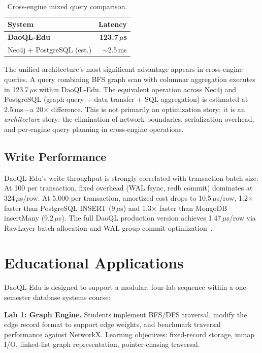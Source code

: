 \documentclass[11pt,a4paper]{article}
\begin{document}
\begin{table}[ht]
\centering
\caption{Cross-engine mixed query comparison.}
\begin{tabular}{lr}
\toprule
\textbf{System} & \textbf{Latency} \\
\midrule
\textbf{DaoQL-Edu}          & \textbf{123.7\,$\mu$s} \\
Neo4j + PostgreSQL (est.)   & $\sim$2.5\,ms \\
\bottomrule
\end{tabular}
\label{tab:mixed}
\end{table}

The unified architecture's most significant advantage appears in
cross-engine queries. A query combining BFS graph scan with columnar
aggregation executes in 123.7\,$\mu$s within DaoQL-Edu. The equivalent
operation across Neo4j and PostgreSQL (graph query + data transfer + SQL
aggregation) is estimated at 2.5\,ms---a 20$\times$ difference. This is
not primarily an optimization story; it is an \emph{architecture} story: the
elimination of network boundaries, serialization overhead, and per-engine
query planning in cross-engine operations.

\subsection{Write Performance}

DaoQL-Edu's write throughput is strongly correlated with transaction batch
size. At 100 per transaction, fixed overhead (WAL fsync, redb commit)
dominates at 324\,$\mu$s/row. At 5,000 per transaction, amortized cost drops
to 10.5\,$\mu$s/row, 1.2$\times$ faster than PostgreSQL INSERT (9\,$\mu$s)
and 1.3$\times$ faster than MongoDB insertMany (9.2\,$\mu$s). The full DaoQL
production version achieves 1.47\,$\mu$s/row via RawLayer batch allocation
and WAL group commit optimization~\cite{helland2007}.

\section{Educational Applications}

DaoQL-Edu is designed to support a modular, four-lab sequence within a
one-semester database systems course:

\textbf{Lab 1: Graph Engine.} Students implement BFS/DFS traversal, modify
the edge record format to support edge weights, and benchmark traversal
performance against NetworkX. Learning objectives: fixed-record storage,
mmap I/O, linked-list graph representation, pointer-chasing traversal.
\end{document}
